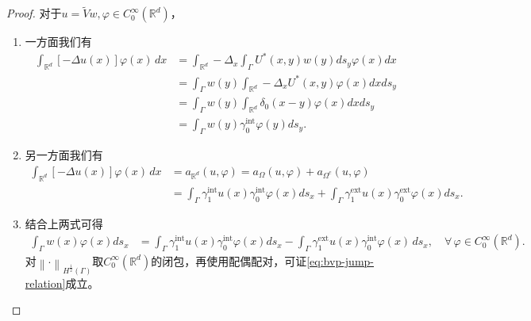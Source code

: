 \begin{proof}
  对于$u = \widetilde{V} w, \varphi \in C_{0}^{\infty}(\mathbb{R}^d)$，
  \begin{enumerate}
    \item 一方面我们有
    \begin{equation*}
      \begin{split}
        \int_{\mathbb{R}^d}
        \left[
        - \Delta u(x)
        \right] \varphi(x) \, dx
        &= \int_{\mathbb{R}^d}
        - \Delta_{x}
        \int_{\Gamma} U^{*}(x,y) w(y) d s_{y}
        \varphi(x)
        d x \\
        &= \int_{\Gamma} w(y)
        \int_{\mathbb{R}^d} - \Delta_{x} U^{*}(x,y) \varphi(x) dx
        d s_y \\
        &= \int_{\Gamma} w(y)
        \int_{\mathbb{R}^{d}} \delta_{0}(x-y) \varphi(x) dx
        d s_y \\
        &= \int_{\Gamma} w(y)
        \gamma_{0}^{\text{int}} \varphi(y) d s_y.
      \end{split}
    \end{equation*}
    \item 另一方面我们有
    \begin{equation*}
      \begin{split}
        \int_{\mathbb{R}^d}
        \left[
        - \Delta u(x)
        \right] \varphi(x) \, dx
        &= a_{\mathbb{R}^{d}}(u, \varphi) = a_{\Omega} (u, \varphi) + a_{\Omega^{c}} (u, \varphi) \\
        &= \int_{\Gamma} \gamma_{1}^{\text{int}} u(x) \gamma_{0}^{\text{int}} \varphi(x) d s_x
        + \int_{\Gamma} \gamma_{1}^{\text{ext}} u(x) \gamma_{0}^{\text{ext}} \varphi(x) d s_x.
      \end{split}
    \end{equation*}
    \item 结合上两式可得
    \begin{equation*}
      \begin{split}
        \int_{\Gamma} w(x) \varphi(x) d s_x &= \int_{\Gamma} \gamma_{1}^{\text{int}} u(x) \gamma_{0}^{\text{int}} \varphi(x) d s_x
        - \int_{\Gamma} \gamma_{1}^{\text{ext}}u(x) \gamma_{0}^{\text{int}} \varphi(x) \, ds_x, \quad \forall \, \varphi \in C_{0}^{\infty}(\mathbb{R}^d).
      \end{split}
    \end{equation*}
    对$\left\| \cdot \right\|_{H^{\frac{1}{2}}(\Gamma)}$取$C_{0}^{\infty}(\mathbb{R}^d)$的闭包，再使用配偶配对，可证\eqref{eq:bvp-jump-relation}成立。
  \end{enumerate}
\end{proof}


